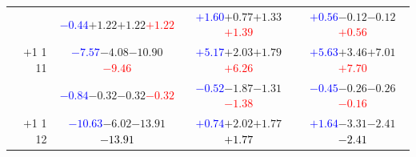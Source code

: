 \documentclass[compress]{beamer}
\begin{document}
\begin{frame}
\begin{tabular}{r | c | c | c}
          & \textcolor{blue}{$-0.44$}\hspace{0.1 cm}$+1.22$\hspace{0.1 cm}$+1.22$\hspace{0.1 cm}\textcolor{red}{$+1.22$} & \textcolor{blue}{$+1.60$}\hspace{0.1 cm}$+0.77$\hspace{0.1 cm}$+1.33$\hspace{0.1 cm}\textcolor{red}{$+1.39$} & \textcolor{blue}{$+0.56$}\hspace{0.1 cm}$-0.12$\hspace{0.1 cm}$-0.12$\hspace{0.1 cm}\textcolor{red}{$+0.56$} \\
$+$1 1 11 & \textcolor{blue}{$-7.57$}\hspace{0.1 cm}$-4.08$\hspace{0.1 cm}$-10.90$\hspace{0.1 cm}\textcolor{red}{$-9.46$} & \textcolor{blue}{$+5.17$}\hspace{0.1 cm}$+2.03$\hspace{0.1 cm}$+1.79$\hspace{0.1 cm}\textcolor{red}{$+6.26$} & \textcolor{blue}{$+5.63$}\hspace{0.1 cm}$+3.46$\hspace{0.1 cm}$+7.01$\hspace{0.1 cm}\textcolor{red}{$+7.70$} \\
          & \textcolor{blue}{$-0.84$}\hspace{0.1 cm}$-0.32$\hspace{0.1 cm}$-0.32$\hspace{0.1 cm}\textcolor{red}{$-0.32$} & \textcolor{blue}{$-0.52$}\hspace{0.1 cm}$-1.87$\hspace{0.1 cm}$-1.31$\hspace{0.1 cm}\textcolor{red}{$-1.38$} & \textcolor{blue}{$-0.45$}\hspace{0.1 cm}$-0.26$\hspace{0.1 cm}$-0.26$\hspace{0.1 cm}\textcolor{red}{$-0.16$} \\
$+$1 1 12 & \textcolor{blue}{$-10.63$}\hspace{0.1 cm}$-6.02$\hspace{0.1 cm}$-13.91$\hspace{0.1 cm}\textcolor{black}{$-13.91$} & \textcolor{blue}{$+0.74$}\hspace{0.1 cm}$+2.02$\hspace{0.1 cm}$+1.77$\hspace{0.1 cm}\textcolor{black}{$+1.77$} & \textcolor{blue}{$+1.64$}\hspace{0.1 cm}$-3.31$\hspace{0.1 cm}$-2.41$\hspace{0.1 cm}\textcolor{black}{$-2.41$} \\

\end{tabular}
\end{frame}
\end{document}
